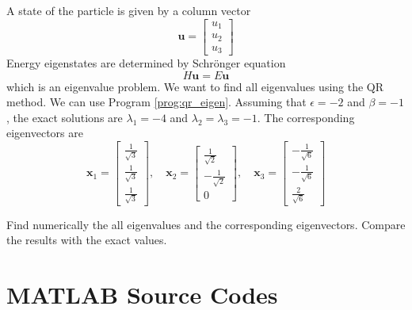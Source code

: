 {\begin{enumerate}[labelwidth=0.5cm,labelindent=0cm,leftmargin=*,label=\bfseries \thechapter.\arabic*,align=left]
A state of the particle is given by a column vector
\begin{equation}
\mathbf{u} = 
\begin{bmatrix}
u_1 \\ u_2 \\ u_3
\end{bmatrix}
\end{equation}
Energy eigenstates are determined by Schr\"{o}nger equation
\begin{equation}
H \mathbf{u} = E \mathbf{u}
\end{equation}
which is an eigenvalue problem. We want to find all eigenvalues using the QR method.  We can use Program \ref{prog:qr_eigen}.
Assuming that $\epsilon=-2$ and $\beta=-1$, the exact solutions are $\lambda_1 = -4$ and $\lambda_2=\lambda_3=-1$.  The corresponding eigenvectors are
\begin{equation}
\mathbf{x}_1 = \begin{bmatrix} \frac{1}{\sqrt{3}} \\ \frac{1}{\sqrt{3}} \\ \frac{1}{\sqrt{3}} \end{bmatrix}, \quad 
\mathbf{x}_2 = \begin{bmatrix} \frac{1}{\sqrt{2}} \\ -\frac{1}{\sqrt{2}} \\ 0  \end{bmatrix}, \quad
\mathbf{x}_3 = \begin{bmatrix} -\frac{1}{\sqrt{6}} \\-\frac{1}{\sqrt{6}} \\ \frac{2}{\sqrt{6}} \end{bmatrix} 
\end{equation} 

Find numerically the all eigenvalues and the corresponding eigenvectors.  Compare the results with the exact values.
\end{enumerate}

\newpage

\noindent
\section*{MATLAB Source Codes}

}
